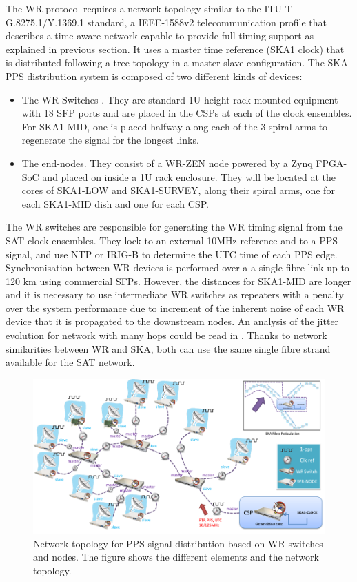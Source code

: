 The WR protocol requires a network topology similar to the ITU-T
G.8275.1/Y.1369.1 standard, a IEEE-1588v2 telecommunication profile that
describes a time-aware network capable to provide full timing support
\cite{itu:TG8275_1_Y_1369_1} as explained in previous section. It uses a master
time reference (SKA1 clock) that is distributed following a tree topology in a
master-slave configuration. The SKA PPS distribution system is composed of two
different kinds of devices:

\begin{itemize} \item {The WR Switches \cite{sevensols:wr_switch}. They are
			standard 1U height rack-mounted equipment with 18 SFP
			ports and are placed in the CSPs at each of the clock
			ensembles. For SKA1-MID, one is placed halfway along
			each of the 3 spiral arms to regenerate the signal for
		the longest links.} \item{The end-nodes. They consist of a
			WR-ZEN node \cite{sevensols:wr_zen} powered by a Zynq
			FPGA-SoC and placed on inside a 1U rack enclosure. They
			will be located at the cores of SKA1-LOW and
SKA1-SURVEY, along their spiral arms, one for each SKA1-MID dish and one for
each CSP.} \end{itemize}

The WR switches are responsible for generating the WR timing signal from the
SAT clock ensembles. They lock to an external 10MHz reference and to a PPS
signal, and use NTP or IRIG-B to determine the UTC time of each PPS edge.
Synchronisation between WR devices is performed over a a single fibre link up
to 120 km using commercial SFPs.  However, the distances for SKA1-MID are
longer and it is necessary to use intermediate WR switches as repeaters with a
penalty over the system performance due to increment of the inherent noise of
each WR device that it is propagated to the downstream nodes. An analysis of
the jitter evolution for network with many hops could be read in
\cite{torres2016scalability}. Thanks to network similarities between WR and
SKA, both can use the same single fibre strand available for the SAT network. 

\begin{figure}[H] \centering \includegraphics[scale=0.4]{img/ska_pps_network}
\caption{Network topology for PPS signal distribution based on WR switches and
nodes. The figure shows the different elements and the network topology. }
\label{fig:ska_pps_dist_network} \end{figure}

